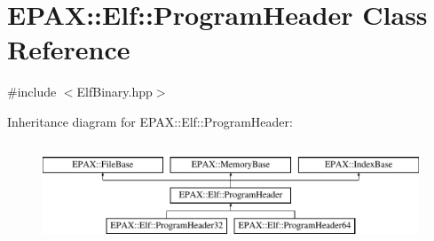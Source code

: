 \hypertarget{class_e_p_a_x_1_1_elf_1_1_program_header}{\section{\-E\-P\-A\-X\-:\-:\-Elf\-:\-:\-Program\-Header \-Class \-Reference}
\label{class_e_p_a_x_1_1_elf_1_1_program_header}
}


{\ttfamily \#include $<$\-Elf\-Binary.\-hpp$>$}

\-Inheritance diagram for \-E\-P\-A\-X\-:\-:\-Elf\-:\-:\-Program\-Header\-:\begin{figure}[H]
\begin{center}
\leavevmode
\includegraphics[height=3.000000cm]{class_e_p_a_x_1_1_elf_1_1_program_header}
\end{center}
\end{figure}
